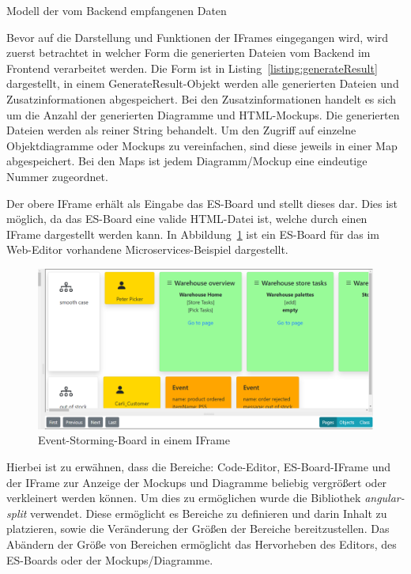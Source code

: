 \begin{listing}[!ht]
    \inputminted{ts}{listings/3.2/GenerateResult.ts}
    \caption{Modell der vom Backend empfangenen Daten}
    \label{listing:generateResult}
\end{listing}

Bevor auf die Darstellung und Funktionen der IFrames eingegangen wird, wird zuerst betrachtet in welcher Form die generierten Dateien vom Backend im Frontend verarbeitet werden.
Die Form ist in Listing~\ref{listing:generateResult} dargestellt, in einem GenerateResult-Objekt werden alle generierten Dateien und Zusatzinformationen abgespeichert.
Bei den Zusatzinformationen handelt es sich um die Anzahl der generierten Diagramme und HTML-Mockups.
Die generierten Dateien werden als reiner String behandelt.
Um den Zugriff auf einzelne Objektdiagramme oder Mockups zu vereinfachen, sind diese jeweils in einer Map abgespeichert.
Bei den Maps ist jedem Diagramm/Mockup eine eindeutige Nummer zugeordnet.

Der obere IFrame erhält als Eingabe das \ac{ES}-Board und stellt dieses dar.
Dies ist möglich, da das \ac{ES}-Board eine valide HTML-Datei ist, welche durch einen IFrame dargestellt werden kann.
In Abbildung~\ref{fig:esBoard} ist ein \ac{ES}-Board für das im Web-Editor vorhandene Microservices-Beispiel dargestellt.

\begin{figure}[h]
    \centering
    \includegraphics[width=1.0\textwidth]{images/3.2/board}
    \caption{Event-Storming-Board in einem IFrame}
    \label{fig:esBoard}
\end{figure}

Hierbei ist zu erwähnen, dass die Bereiche: Code-Editor, \ac{ES}-Board-IFrame und der IFrame zur Anzeige der Mockups und Diagramme beliebig vergrößert oder verkleinert werden können.
Um dies zu ermöglichen wurde die Bibliothek \textit{angular-split} verwendet.
Diese ermöglicht es Bereiche zu definieren und darin Inhalt zu platzieren, sowie die Veränderung der Größen der Bereiche bereitzustellen\cite*{angular-split}.
Das Abändern der Größe von Bereichen ermöglicht das Hervorheben des Editors, des \ac{ES}-Boards oder der Mockups/Diagramme.

